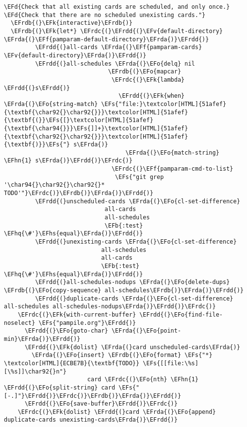 \documentclass[a4wide,10pt]{article}
\newcommand{\EFs}[1]{\textcolor{EFs}{#1}} %
\newcommand{\EFd}[1]{\textcolor{EFd}{#1}} %
\newcommand{\EFk}[1]{\textcolor{EFk}{#1}} %
\newcommand{\EFb}[1]{\textcolor{EFb}{#1}} %
\newcommand{\EFf}[1]{\textcolor{EFf}{#1}} %
\newcommand{\EFv}[1]{\textcolor{EFv}{#1}} %
\newcommand{\EFo}[1]{\textcolor{EFo}{#1}} %
\newcommand{\EFhn}[1]{\textcolor{EFhn}{\textbf{#1}}} %
\newcommand{\EFhq}[1]{\textcolor{EFhq}{#1}} %
\newcommand{\EFhs}[1]{\textcolor{EFhs}{#1}} %
\newcommand{\EFrda}[1]{\textcolor{EFrda}{#1}} %
\newcommand{\EFrdb}[1]{\textcolor{EFrdb}{#1}} %
\newcommand{\EFrdc}[1]{\textcolor{EFrdc}{#1}} %
\newcommand{\EFrdd}[1]{\textcolor{EFrdd}{#1}} %
\begin{document}
\begin{Code}
\begin{Verbatim}
\EFd{Check that all existing cards are scheduled, and only once.}
\EFd{Check that there are no scheduled unexisting cards."}
  \EFrdb{(}\EFk{interactive}\EFrdb{)}
  \EFrdb{(}\EFk{let*} \EFrdc{(}\EFrdd{(}\EFv{default-directory} \EFrda{(}\EFf{pamparam-default-directory}\EFrda{)}\EFrdd{)}
         \EFrdd{(}all-cards \EFrda{(}\EFf{pamparam-cards} \EFv{default-directory}\EFrda{)}\EFrdd{)}
         \EFrdd{(}all-schedules \EFrda{(}\EFo{delq} nil
                              \EFrdb{(}\EFo{mapcar}
                               \EFrdc{(}\EFk{lambda} \EFrdd{(}s\EFrdd{)}
                                 \EFrdd{(}\EFk{when} \EFrda{(}\EFo{string-match} \EFs{"file:}\textcolor[HTML]{51afef}{\textbf{\char92{}\char92{}}}\textcolor[HTML]{51afef}{\textbf{(}}\EFs{[}\textcolor[HTML]{51afef}{\textbf{\char94{}}}\EFs{]]+}\textcolor[HTML]{51afef}{\textbf{\char92{}\char92{}}}\textcolor[HTML]{51afef}{\textbf{)}}\EFs{"} s\EFrda{)}
                                   \EFrda{(}\EFo{match-string} \EFhn{1} s\EFrda{)}\EFrdd{)}\EFrdc{)}
                               \EFrdc{(}\EFf{pamparam-cmd-to-list}
                                \EFs{"git grep '\char94{}\char92{}\char92{}* TODO'"}\EFrdc{)}\EFrdb{)}\EFrda{)}\EFrdd{)}
         \EFrdd{(}unscheduled-cards \EFrda{(}\EFo{cl-set-difference}
                             all-cards
                             all-schedules
                             \EFb{:test} \EFhq{\#'}\EFhs{equal}\EFrda{)}\EFrdd{)}
         \EFrdd{(}unexisting-cards \EFrda{(}\EFo{cl-set-difference}
                            all-schedules
                            all-cards
                            \EFb{:test} \EFhq{\#'}\EFhs{equal}\EFrda{)}\EFrdd{)}
         \EFrdd{(}all-schedules-nodups \EFrda{(}\EFo{delete-dups} \EFrdb{(}\EFo{copy-sequence} all-schedules\EFrdb{)}\EFrda{)}\EFrdd{)}
         \EFrdd{(}duplicate-cards \EFrda{(}\EFo{cl-set-difference} all-schedules all-schedules-nodups\EFrda{)}\EFrdd{)}\EFrdc{)}
    \EFrdc{(}\EFk{with-current-buffer} \EFrdd{(}\EFo{find-file-noselect} \EFs{"pampile.org"}\EFrdd{)}
      \EFrdd{(}\EFo{goto-char} \EFrda{(}\EFo{point-min}\EFrda{)}\EFrdd{)}
      \EFrdd{(}\EFk{dolist} \EFrda{(}card unscheduled-cards\EFrda{)}
        \EFrda{(}\EFo{insert} \EFrdb{(}\EFo{format} \EFs{"*} \textcolor[HTML]{ECBE7B}{\textbf{TODO}} \EFs{[[file:\%s][\%s]]\char92{}n"}
                        card \EFrdc{(}\EFo{nth} \EFhn{1} \EFrdd{(}\EFo{split-string} card \EFs{"[-.]"}\EFrdd{)}\EFrdc{)}\EFrdb{)}\EFrda{)}\EFrdd{)}
      \EFrdd{(}\EFo{save-buffer}\EFrdd{)}\EFrdc{)}
    \EFrdc{(}\EFk{dolist} \EFrdd{(}card \EFrda{(}\EFo{append} duplicate-cards unexisting-cards\EFrda{)}\EFrdd{)}

\end{Verbatim}
\end{Code}
\end{document}
